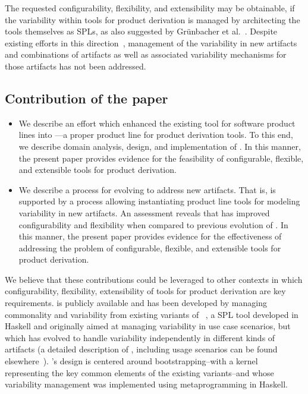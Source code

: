 

The requested configurability, flexibility, and extensibility may be obtainable, if the variability within tools for product derivation is managed by architecting the tools themselves as SPLs, as also suggested by Gr{\"u}nbacher et al.~\cite{grunbacher:2008}. Despite existing efforts in this direction~\cite{grunbacher:2011,grunbacher:2008,batory-ahead-bootstrap}, management of the variability in new artifacts and combinations of artifacts as well as associated variability mechanisms for those artifacts has not been addressed. 


\subsection*{Contribution of the paper}

\begin{itemize}

\item We describe an effort which enhanced the existing \hp{} tool for software product lines into \hpl---a proper
  product line for product derivation tools. To this end, we describe domain analysis, design, and implementation of \hpl. In this manner, the present paper provides evidence for the feasibility of configurable, flexible, and extensible tools for product derivation.

\item We describe a process for evolving \hpl{} to address new artifacts. That is, \hpl{} is supported by a process allowing instantiating product line tools for modeling variability in new artifacts. An assessment reveals that \hpl{} has improved configurability and flexibility when compared to previous evolution of \hp. In this manner, the present paper provides evidence for the effectiveness of addressing the problem of configurable, flexible, and extensible tools for product derivation.

\end{itemize}

We believe that these contributions could be leveraged to other contexts in which configurability, flexibility, extensibility of tools for product derivation are key requirements. \hpl{} is publicly available  and has been developed by managing commonality and variability from existing variants of \hp~\cite{rbonifacio:sbcars2009}, a SPL tool developed in Haskell and originally aimed at managing variability in use case scenarios, but which has evolved to handle variability independently in different kinds of artifacts (a detailed description of \hp, including usage scenarios can be found elsewhere~\cite{rbonifacio:sbcars2009}). \hpl's design is centered around bootstrapping--with a kernel representing the key common elements of the existing \hp{} variants--and whose variability management was implemented using metaprogramming in Haskell.

